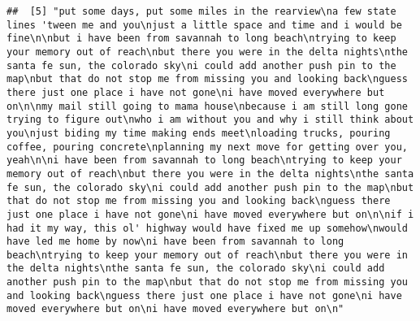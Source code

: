 \documentclass[]{article}
\begin{document}
\begin{verbatim}
##  [5] "put some days, put some miles in the rearview\na few state lines 'tween me and you\njust a little space and time and i would be fine\n\nbut i have been from savannah to long beach\ntrying to keep your memory out of reach\nbut there you were in the delta nights\nthe santa fe sun, the colorado sky\ni could add another push pin to the map\nbut that do not stop me from missing you and looking back\nguess there just one place i have not gone\ni have moved everywhere but on\n\nmy mail still going to mama house\nbecause i am still long gone trying to figure out\nwho i am without you and why i still think about you\njust biding my time making ends meet\nloading trucks, pouring coffee, pouring concrete\nplanning my next move for getting over you, yeah\n\ni have been from savannah to long beach\ntrying to keep your memory out of reach\nbut there you were in the delta nights\nthe santa fe sun, the colorado sky\ni could add another push pin to the map\nbut that do not stop me from missing you and looking back\nguess there just one place i have not gone\ni have moved everywhere but on\n\nif i had it my way, this ol' highway would have fixed me up somehow\nwould have led me home by now\ni have been from savannah to long beach\ntrying to keep your memory out of reach\nbut there you were in the delta nights\nthe santa fe sun, the colorado sky\ni could add another push pin to the map\nbut that do not stop me from missing you and looking back\nguess there just one place i have not gone\ni have moved everywhere but on\ni have moved everywhere but on\n"                                                                                                                                                                                                                                                                                                                                                                                                                                                                                                                                                                                                                                                                                                                                                                                                                                                                                                                                                                                                                                                                                                                                                                                                                                                                                                                                                           

\end{verbatim}
\end{document}
